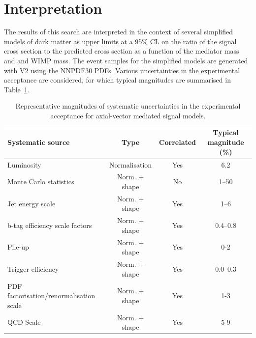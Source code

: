 \clearpage
\section{Interpretation}

The results of this search are interpreted in the context of several simplified models of dark matter as upper limits at a 95\% CL on the ratio of the signal cross section to the predicted cross section as a function of the mediator mass and and WIMP mass. The event samples for the simplified models are generated with \POWHEG V2 using the NNPDF30 PDFs. Various uncertainties in the experimental
acceptance are considered, for which typical magnitudes are summarised in Table~\ref{tab:signal_systs}.

\begin{table}[h!]
  \caption{%
    Representative magnitudes of systematic uncertainties in the experimental
    acceptance for axial-vector mediated signal models.
  }
  \label{tab:signal_systs}
  \centering
  \small
  \begin{tabular}{ lccc }
    \hline
    \hline
    Systematic source                       & Type          & Correlated & Typical magnitude (\%) \\
    \hline
    Luminosity                              & Normalisation & Yes        & 6.2                    \\
    Monte Carlo statistics                  & Norm. + shape & No         & 1--50                  \\
    Jet energy scale                        & Norm. + shape & Yes        & 1--6                   \\
    b-tag efficiency scale factors          & Norm. + shape & Yes        & 0.4--0.8               \\
    Pile-up                                 & Norm. + shape & Yes        & 0-2                    \\
    Trigger efficiency                      & Norm. + shape & Yes        & 0.0--0.3               \\
    PDF factorisation/renormalisation scale & Norm. + shape & Yes        & 1-3                    \\
    QCD Scale                               & Norm. + shape & Yes        & 5-9                    \\
    \hline
    \hline
  \end{tabular}
\end{table}
  

